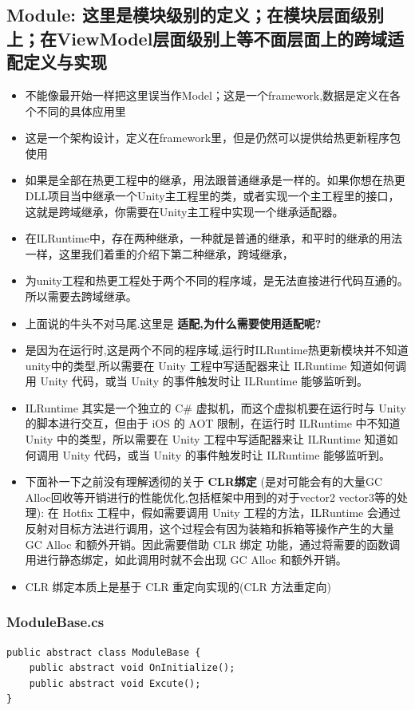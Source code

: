 \documentclass[9pt, b5paper]{article}
\begin{document}
\subsection{Module: 这里是模块级别的定义；在模块层面级别上；在ViewModel层面级别上等不面层面上的跨域适配定义与实现}
\label{sec-6-3}
\begin{itemize}
\item 不能像最开始一样把这里误当作Model；这是一个framework,数据是定义在各个不同的具体应用里
\item 这是一个架构设计，定义在framework里，但是仍然可以提供给热更新程序包使用
\item 如果是全部在热更工程中的继承，用法跟普通继承是一样的。如果你想在热更DLL项目当中继承一个Unity主工程里的类，或者实现一个主工程里的接口，这就是跨域继承，你需要在Unity主工程中实现一个继承适配器。
\item 在ILRuntime中，存在两种继承，一种就是普通的继承，和平时的继承的用法一样，这里我们着重的介绍下第二种继承，跨域继承，
\item 为unity工程和热更工程处于两个不同的程序域，是无法直接进行代码互通的。所以需要去跨域继承。
\item 上面说的牛头不对马尾.这里是 \textbf{适配,为什么需要使用适配呢?}
\item 是因为在运行时,这是两个不同的程序域,运行时ILRuntime热更新模块并不知道unity中的类型,所以需要在 Unity 工程中写适配器来让 ILRuntime 知道如何调用 Unity 代码，或当 Unity 的事件触发时让 ILRuntime 能够监听到。
\item ILRuntime 其实是一个独立的 C\# 虚拟机，而这个虚拟机要在运行时与 Unity 的脚本进行交互，但由于 iOS 的 AOT 限制，在运行时 ILRuntime 中不知道 Unity 中的类型，所以需要在 Unity 工程中写适配器来让 ILRuntime 知道如何调用 Unity 代码，或当 Unity 的事件触发时让 ILRuntime 能够监听到。
\item 下面补一下之前没有理解透彻的关于 \textbf{CLR绑定} (是对可能会有的大量GC Alloc回收等开销进行的性能优化,包括框架中用到的对于vector2 vector3等的处理): 在 Hotfix 工程中，假如需要调用 Unity 工程的方法，ILRuntime 会通过反射对目标方法进行调用，这个过程会有因为装箱和拆箱等操作产生的大量 GC Alloc 和额外开销。因此需要借助 CLR 绑定 功能，通过将需要的函数调用进行静态绑定，如此调用时就不会出现 GC Alloc 和额外开销。
\item CLR 绑定本质上是基于 CLR 重定向实现的(CLR 方法重定向)
\end{itemize}
\subsubsection{ModuleBase.cs}
\label{sec-6-3-1}
\begin{verbatim}
public abstract class ModuleBase {
    public abstract void OnInitialize();
    public abstract void Excute();
}
\end{verbatim}
\end{document}
